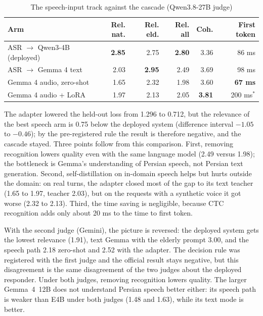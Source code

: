 \begin{table}[ht]
\centering
\caption{The speech-input track against the cascade (Qwen3.8-27B judge)}
\label{tab:speechin}
\small
\begin{tabular}{lrrrrr}
\toprule
Arm & Rel. nat. & Rel. eld. & Rel. all & Coh. & First token \\
\midrule
ASR $\rightarrow$ Qwen3-4B (deployed) & \textbf{2.85} & 2.75 & \textbf{2.80} & 3.36 & 86 ms \\
ASR $\rightarrow$ Gemma 4 text & 2.03 & \textbf{2.95} & 2.49 & 3.69 & 98 ms \\
Gemma 4 audio, zero-shot & 1.65 & 2.32 & 1.98 & 3.60 & \textbf{67 ms} \\
Gemma 4 audio + LoRA & 1.97 & 2.13 & 2.05 & \textbf{3.81} & 200 ms$^{*}$ \\
\bottomrule
\end{tabular}
\par{}
\end{table}

The adapter lowered the held-out loss from 1.296 to 0.712, but the relevance of the best
speech arm is 0.75 below the deployed system (difference interval $-1.05$ to $-0.46$); by
the pre-registered rule the result is therefore negative, and the cascade stayed. Three
points follow from this comparison. First, removing recognition lowers quality even with the
same language model (2.49 versus 1.98); the bottleneck is Gemma's understanding of Persian
speech, not Persian text generation. Second, self-distillation on in-domain speech helps but
hurts outside the domain: on real turns, the adapter closed most of the gap to its text
teacher (1.65 to 1.97, teacher 2.03), but on the requests with a synthetic voice it got worse
(2.32 to 2.13). Third, the time saving is negligible, because CTC recognition adds only about
20 ms to the time to first token.

With the second judge (Gemini), the picture is reversed: the deployed system gets the lowest
relevance (1.91), text Gemma with the elderly prompt 3.00, and the speech path 2.18 zero-shot
and 2.52 with the adapter. The decision rule was registered with the first judge and the
official result stays negative, but this disagreement is the same disagreement of the two
judges about the deployed responder. Under both judges, removing recognition lowers quality.
The larger Gemma~4~12B does not understand Persian speech better either: its speech path is
weaker than E4B under both judges (1.48 and 1.63), while its text mode is better.

